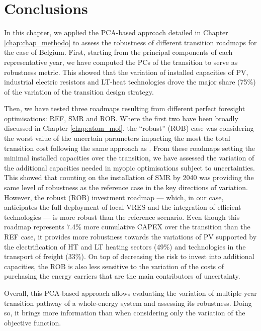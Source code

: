 \newpage
\section{Conclusions}
\label{sec:RobPol:Conclusions}
In this chapter, we applied the \gls{PCA}-based approach detailed in Chapter \ref{chap:chap_methodo} to assess the robustness of different transition roadmaps for the case of Belgium. First, starting from the principal components of each representative year, we have computed the PCs of the transition to serve as robustness metric. This showed that the variation of installed capacities of \gls{PV}, industrial electric resistors and \gls{LT}-heat technologies drove the major share (75\%) of the variation of the transition design strategy.  

Then, we have tested three roadmaps resulting from different perfect foresight optimisations: REF, SMR and ROB. Where the first two have been broadly discussed in Chapter \ref{chap:atom_mol}, the ``robust'' (ROB) case was considering the worst value of the uncertain parameters impacting the most the total transition cost following the same approach as \citet{Moret2017PhDThesis}. From these roadmaps setting the minimal installed capacities over the transition, we have assessed the variation of the additional capacities needed in myopic optimisations subject to uncertainties. This showed that counting on the installation of \gls{SMR} by 2040 was providing the same level of robustness as the reference case in the key directions of variation. However, the robust (ROB) investment roadmap --- which, in our case, anticipates the full deployment of local \gls{VRES} and the integration of efficient technologies --- is more robust than the reference scenario. Even though this roadmap represents 7.4\% more cumulative \gls{CAPEX} over the transition than the REF case, it provides more robustness towards the variations of \gls{PV} supported by the electrification of \gls{HT} and \gls{LT} heating sectors (49\%) and technologies in the transport of freight (33\%).  On top of decreasing the risk to invest into additional capacities, the ROB is also less sensitive to the variation of the costs of purchasing the energy carriers that are the main contributors of uncertainty.

Overall, this \gls{PCA}-based approach allows evaluating the variation of multiple-year transition pathway of a whole-energy system and assessing its robustness. Doing so, it brings more information than when considering only the variation of the objective function.


